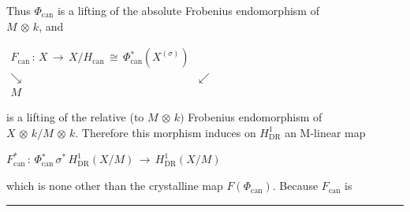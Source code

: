 \documentclass[9pt]{article}
\newcommand{\CanonText}[1]{\par{\fontsize{8.0}{9.35}\selectfont\RaggedRight #1\par}\vspace{2.2pt}}
\newcommand{\CanonDisplay}[1]{\par\vspace{1.2pt}\begin{center}{\fontsize{7.2}{8.4}\selectfont\(\displaystyle #1\)}\end{center}\vspace{1.2pt}}
\newenvironment{CanonMathBlock}{\par\vspace{1.2pt}\begin{center}\fontsize{6.8}{8.0}\selectfont\(\displaystyle}{\)\end{center}\vspace{1.2pt}}
\begin{document}
\begin{minipage}[t][\dimexpr\textheight-5pt\relax][t]{\textwidth}
\CanonText{Thus \(\Phi{}_{\mathrm{can}}\) is a lifting of the absolute Frobenius endomorphism of\\\(M\) \(\otimes{}\) \(k\), and}
\begin{CanonMathBlock}
\begin{array}{cc}
F_{\mathrm{can}}\,:\,X\,\to{}\,X/H_{\mathrm{can}}\,\cong{}\,\Phi{}_{\mathrm{can}}^{*}(X^{(\sigma{})}) & {}\\
\searrow{} & \swarrow{}\\
M & {}
\end{array}
\end{CanonMathBlock}
\CanonText{is a lifting of the relative (to \(M\) \(\otimes{}\) \(k)\) Frobenius endomorphism of\\\(X\) \(\otimes{}\) \(k/M\) \(\otimes{}\) \(k\). Therefore this morphism induces on \(H^{1}_{\mathrm{DR}}\) an M-linear map}
\CanonDisplay{F_{\mathrm{can}}^{*}\,:\,\Phi{}_{\mathrm{can}}^{*}\,\sigma{}^{*}\,H^{1}_{\mathrm{DR}}(X/M)\,\to{}\,H^{1}_{\mathrm{DR}}(X/M)}
\CanonText{which is none other than the crystalline map \(F(\Phi{}_{\mathrm{can}})\). Because \(F_{\mathrm{can}}\) is}
\vfill
{\color{Accent}\hrule height 0.35pt}\vspace{3pt}
\end{minipage}
\newpage
\end{document}

